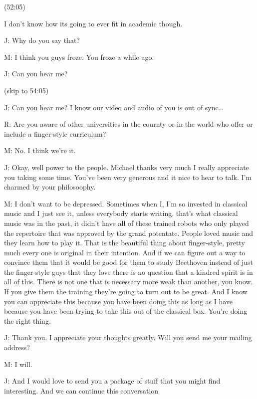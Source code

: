 \documentclass[11pt]{article}
\begin{document}
(52:05)

I don't know how its going to ever fit in academic though. 

J: Why do you say that?

M: I think you guys froze. You froze a while ago.

J: Can you hear me?

(skip to 54:05)

J: Can you hear me? I know our video and audio of you is out of sync\ldots{}

R: Are you aware of other universities in the cournty or in the world who offer or include a finger-style curriculum?

M: No. I think we're it. 

J: Okay, well power to the people. Michael thanks very much I really appreciate you taking some time. You've been very generous and it nice to hear to talk. I'm charmed by your philosoophy.

M: I don't want to be depressed. Sometimes when I, I'm so invested in classical music and I just see it, unless everybody starts writing, that's what classical music was in the past, it didn't have all of these trained robots who only played the repertoire that was approved by the grand potentate. People loved music and they learn how to play it. That is the beautiful thing about finger-style, pretty much every one is original in their intention. And if we can figure out a way to convince them that it would be good for them to study Beethoven instead of just the finger-style guys that they love there is no question that a kindred spirit is in all of this. There is not one that is necessary more weak than another, you know. If you give them the training they're going to turn out to be great. And I know you can appreciate this because you have been doing this as long as I have because you have been trying to take this out of the classical box. You're doing the right thing. 

J: Thank you. I appreciate your thoughts greatly. Will you send me your mailing address?

M: I will.

J: And I would love to send you a package of stuff that you might find interesting. And we can continue this conversation
\end{document}
